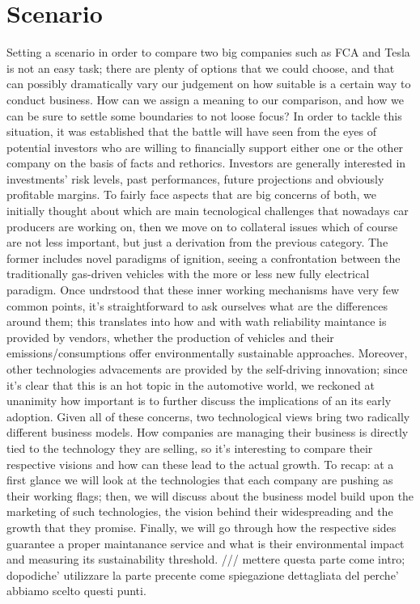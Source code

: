 \section{Scenario}

Setting a scenario in order to compare two big companies such as FCA and Tesla is not an easy task; there are plenty of options that we could choose, and that can possibly dramatically vary our judgement on how suitable is a certain way to conduct business. How can we assign a meaning to our comparison, and how we can be sure to settle some boundaries to not loose focus?
In order to tackle this situation, it was established that the battle will have seen from the eyes of potential investors who are willing to financially support either one or the other company on the basis of facts and rethorics. \n
Investors are generally interested in investments' risk levels, past performances, future projections and obviously profitable margins. To fairly face aspects that are big concerns of both, we initially thought about which are main tecnological challenges that nowadays car producers are working on, then we move on to collateral issues which of course are not less important, but just a derivation from the previous category. The former includes novel paradigms of ignition, seeing a confrontation between the traditionally gas-driven vehicles with the more or less new fully electrical paradigm. Once undrstood that these inner working mechanisms have very few common points, it's straightforward to ask ourselves what are the differences around them; this translates into how and with wath reliability maintance is provided by vendors, whether the production of vehicles and their emissions/consumptions offer environmentally sustainable approaches.
Moreover, other technologies advacements are provided by the self-driving innovation; since it's clear that this is an hot topic in the automotive world, we reckoned at unanimity how important is to further discuss the implications of an its early adoption.
Given all of these concerns, two technological views bring two radically different business models. How companies are managing their business is directly tied to the technology they are selling, so it's interesting to compare their respective visions and how can these lead to the actual growth. \n
To recap: at a first glance we will look at the technologies that each company are pushing as their working flags; then, we will discuss about the business model build upon the marketing of such technologies, the vision behind their widespreading and the growth that they promise. Finally, we will go through how the respective sides guarantee a proper maintanance service and what is their environmental impact and measuring its sustainability threshold. /// mettere questa parte come intro; dopodiche' utilizzare la parte precente come spiegazione dettagliata del perche' abbiamo scelto questi punti.

